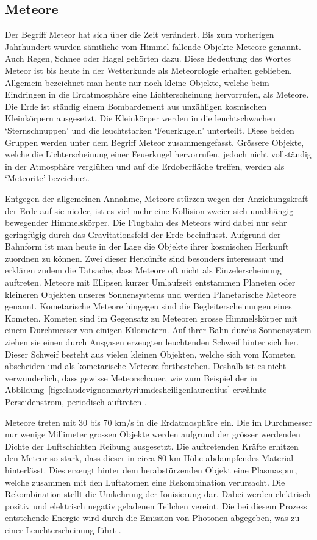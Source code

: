 \begin{refsection}
\section{Meteore}

Der Begriff Meteor hat sich über die Zeit verändert. 
Bis zum vorherigen Jahrhundert wurden sämtliche vom Himmel fallende Objekte Meteore genannt. 
Auch Regen, Schnee oder Hagel gehörten dazu. 
Diese Bedeutung des Wortes Meteor ist bis heute in der Wetterkunde als Meteorologie erhalten geblieben.
Allgemein bezeichnet man heute nur noch kleine Objekte, welche beim Eindringen in die Erdatmosphäre eine Lichterscheinung hervorrufen, als Meteore.  
Die Erde ist ständig einem Bombardement aus unzähligen kosmischen Kleinkörpern ausgesetzt. 
Die Kleinkörper werden in die leuchtschwachen `Sternschnuppen' und die leuchtstarken `Feuerkugeln' unterteilt.
Diese beiden Gruppen werden unter dem Begriff Meteor zusammengefasst.
Grössere Objekte, welche die Lichterscheinung einer Feuerkugel hervorrufen, jedoch nicht vollständig in der Atmosphäre verglühen und auf die Erdoberfläche treffen, werden als `Meteorite' bezeichnet.

Entgegen der allgemeinen Annahme, Meteore stürzen wegen der Anziehungskraft der Erde auf sie nieder, ist es viel mehr eine Kollision zweier sich unabhängig bewegender Himmelskörper. 
Die Flugbahn des Meteors wird dabei nur sehr geringfügig durch das Gravitationsfeld der Erde beeinflusst.
Aufgrund der Bahnform ist man heute in der Lage die Objekte ihrer kosmischen Herkunft zuordnen zu können. 
Zwei dieser Herkünfte sind besonders interessant und erklären zudem die Tatsache, dass Meteore oft nicht als Einzelerscheinung auftreten. 
Meteore mit Ellipsen kurzer Umlaufzeit entstammen Planeten oder kleineren Objekten unseres Sonnensystems und werden Planetarische Meteore genannt.
Kometarische Meteore hingegen sind die Begleiterscheinungen eines Kometen. 
Kometen sind im Gegensatz zu Meteoren grosse Himmelskörper mit einem Durchmesser von einigen Kilometern.
Auf ihrer Bahn durchs Sonnensystem ziehen sie einen durch Ausgasen erzeugten leuchtenden Schweif hinter sich her.
Dieser Schweif besteht aus vielen kleinen Objekten, welche sich vom Kometen abscheiden und als kometarische Meteore fortbestehen.
Deshalb ist es nicht verwunderlich, dass gewisse Meteorschauer, wie zum Beispiel der in Abbildung~\ref{fig:claudevignonmartyriumdesheiligenlaurentius} erwähnte Perseidenstrom, periodisch auftreten \cite{lexikon:meyer}.

Meteore treten mit 30 bis 70 km/s in die Erdatmosphäre ein. 
Die im Durchmesser nur wenige Millimeter grossen Objekte werden aufgrund der grösser werdenden Dichte der Luftschichten Reibung ausgesetzt.
Die auftretenden Kräfte erhitzen den Meteor so stark, dass dieser in circa 80 km Höhe abdampfendes Material hinterlässt.
Dies erzeugt hinter dem herabstürzenden Objekt eine Plasmaspur, welche zusammen mit den Luftatomen eine Rekombination verursacht.
Die Rekombination stellt die Umkehrung der Ionisierung dar. 
Dabei werden elektrisch positiv und elektrisch negativ geladenen Teilchen vereint.
Die bei diesem Prozess entstehende Energie wird durch die Emission von Photonen abgegeben, was zu einer Leuchterscheinung führt \cite{web:brodbeck}.


\end{refsection}

